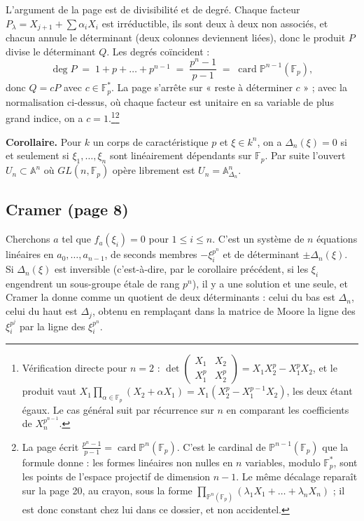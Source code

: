 \documentclass[11pt,a4paper]{article}
\begin{document}
L'argument de la page est de divisibilité et de degré. Chaque facteur
$P_\lambda = X_{j+1} + \sum \alpha_i X_i$ est irréductible, ils sont deux à
deux non associés, et chacun annule le déterminant (deux colonnes
deviennent liées), donc le produit $P$ divise le déterminant $Q$. Les degrés
coïncident :
\[
  \deg P \;=\; 1 + p + \dots + p^{n-1} \;=\; \frac{p^n - 1}{p - 1}
  \;=\; \operatorname{card} \mathbb{P}^{n-1}(\mathbb{F}_p) ,
\]
donc $Q = c P$ avec $c \in \mathbb{F}_p^*$. La page s'arrête sur « reste à
déterminer $c$ » ; avec la normalisation ci-dessus, où chaque facteur est
unitaire en sa variable de plus grand indice, on a $c =
1$.\footnote{Vérification directe pour $n = 2$ :
$\det\begin{pmatrix} X_1 & X_2 \\ X_1^p & X_2^p \end{pmatrix}
= X_1 X_2^p - X_1^p X_2$, et le produit vaut
$X_1 \prod_{\alpha \in \mathbb{F}_p}(X_2 + \alpha X_1)
= X_1 (X_2^p - X_1^{p-1} X_2)$, les deux étant égaux. Le cas général suit
par récurrence sur $n$ en comparant les coefficients de
$X_n^{p^{n-1}}$.}\footnote{La page écrit
$\frac{p^n - 1}{p-1} = \operatorname{card} \mathbb{P}^n(\mathbb{F}_p)$. C'est
le cardinal de $\mathbb{P}^{n-1}(\mathbb{F}_p)$ que la formule donne : les
formes linéaires non nulles en $n$ variables, modulo $\mathbb{F}_p^*$, sont
les points de l'espace projectif de dimension $n-1$. Le même décalage
reparaît sur la page 20, au crayon, sous la forme
$\prod_{\mathbb{P}^n(\mathbb{F}_p)}(\lambda_1 X_1 + \dots + \lambda_n X_n)$ ;
il est donc constant chez lui dans ce dossier, et non accidentel.}

\textbf{Corollaire.} Pour $k$ un corps de caractéristique $p$ et
$\xi \in k^n$, on a $\Delta_n(\xi) = 0$ si et seulement si
$\xi_1, \dots, \xi_n$ sont linéairement dépendants sur $\mathbb{F}_p$. Par
suite l'ouvert $U_n \subset \mathbb{A}^n$ où $GL(n, \mathbb{F}_p)$ opère
librement est $U_n = \mathbb{A}^n_{\Delta_n}$.

\subsection*{Cramer (page 8)}

Cherchons $a$ tel que $f_a(\xi_i) = 0$ pour $1 \leqslant i \leqslant n$.
C'est un système de $n$ équations linéaires en $a_0, \dots, a_{n-1}$, de
seconds membres $-\xi_i^{p^n}$ et de déterminant $\pm\Delta_n(\xi)$. Si
$\Delta_n(\xi)$ est inversible (c'est-à-dire, par le corollaire précédent,
si les $\xi_i$ engendrent un sous-groupe étale de rang $p^n$), il y a une
solution et une seule, et Cramer la donne comme un quotient de deux
déterminants : celui du bas est $\Delta_n$, celui du haut est $\Delta_j$,
obtenu en remplaçant dans la matrice de Moore la ligne des $\xi_i^{p^j}$ par
la ligne des $\xi_i^{p^n}$.
\end{document}
